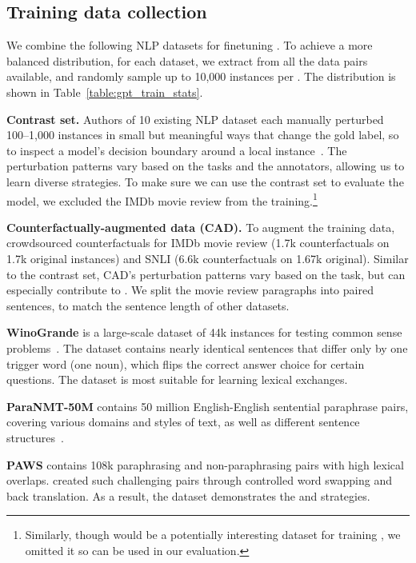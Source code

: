 \subsection{Training data collection}


We combine the following NLP datasets for finetuning \sysname.
To achieve a more balanced distribution, for each dataset, we extract \tagstrs from all the data pairs available, and randomly sample up to 10,000 instances per \tagstr.
The distribution is shown in Table~\ref{table:gpt_train_stats}.

\textbf{Contrast set.}
Authors of 10 existing NLP dataset each manually perturbed 100--1,000 instances in small but meaningful ways that change the gold label, so to inspect a model's decision boundary around a local instance~\cite{gardner2020contrast}.
The perturbation patterns vary based on the tasks and the annotators, allowing us to learn diverse strategies.
To make sure we can use the contrast set to evaluate the \sst model, we excluded the IMDb movie review from the training.\footnote{Similarly, though \qqp would be a potentially interesting dataset for training \sysname, we omitted it so \qqp can be used in our evaluation.}


\textbf{Counterfactually-augmented data (CAD).}
To augment the training data, \citet{kaushik2019learning} crowdsourced counterfactuals for IMDb movie review (1.7k counterfactuals on 1.7k original instances) and SNLI (6.6k counterfactuals on 1.67k original).
Similar to the contrast set, CAD's perturbation patterns vary based on the task, but can especially contribute to .
We split the movie review paragraphs into paired sentences, to match the sentence length of other datasets.


\textbf{WinoGrande} is a large-scale dataset of 44k instances for testing common sense problems~\cite{sakaguchi2019winogrande}.
The dataset contains nearly identical sentences that differ only by one trigger word (\eg one noun), which flips the correct answer choice for certain questions.
The dataset is most suitable for learning lexical exchanges.

\textbf{ParaNMT-50M} contains 50 million English-English sentential paraphrase pairs, covering various domains and styles of text, as well as different sentence structures~\cite{wieting2017paranmt}. 

\textbf{PAWS} contains 108k paraphrasing and non-paraphrasing pairs with high lexical overlaps. 
\citet{zhang2019paws} created such challenging pairs through controlled word swapping and back translation.
As a result, the dataset demonstrates the  and  strategies.


